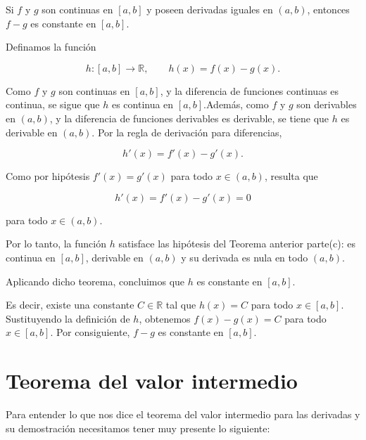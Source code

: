 \begin{corolario}
    Si $f$ y $g$ son continuas en $[a,b]$ y poseen derivadas iguales en
$(a,b)$, entonces $f-g$ es constante en $[a,b]$.
\end{corolario}
\begin{prueba}
    Definamos la función

\[
h:[a,b]\to\mathbb{R},
\qquad
h(x)=f(x)-g(x).
\]

Como $f$ y $g$ son continuas en $[a,b]$, y la diferencia de funciones continuas es continua, se sigue que $h$ es continua en $[a,b]$.Además, como $f$ y $g$ son derivables en $(a,b)$, y la diferencia de funciones derivables es derivable, se tiene que $h$ es derivable en $(a,b)$. Por la regla de derivación para diferencias,

\[
h'(x)=f'(x)-g'(x).
\]

Como por hipótesis $f'(x)=g'(x)$
para todo $x\in(a,b)$, resulta que

\[
h'(x)=f'(x)-g'(x)=0
\]

para todo $x\in(a,b)$.

Por lo tanto, la función $h$ satisface las hipótesis del Teorema anterior parte(c): es continua en $[a,b]$, derivable en $(a,b)$ y su derivada es nula en todo $(a,b)$.

Aplicando dicho teorema, concluimos que $h$ es constante en $[a,b]$.

Es decir, existe una constante $C\in\mathbb{R}$ tal que $h(x)=C$
para todo $x\in[a,b]$. Sustituyendo la definición de $h$, obtenemos $f(x)-g(x)=C$
para todo $x\in[a,b]$. Por consiguiente, $f-g$ es constante en $[a,b]$.

\end{prueba}

\section{Teorema del valor intermedio}

Para entender lo que nos dice el teorema del valor intermedio para las derivadas y su demostración necesitamos tener muy presente lo siguiente:

